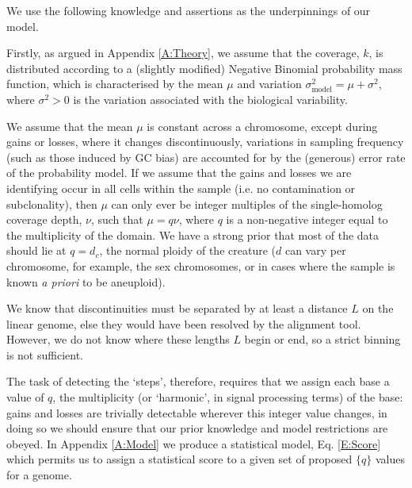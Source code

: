 \documentclass[fleqn,usenatbib]{acmart}
\newcommand{\eref}[1]{Eq. \eqref{#1}}
\begin{document}
				We use the following knowledge and assertions as the underpinnings of our model.

				Firstly, as argued in Appendix \ref{A:Theory}, we assume that the coverage, $k$, is distributed according to a (slightly modified) Negative Binomial probability mass function, which is characterised by the mean $\mu$ and variation $\sigma^2_\text{model} = \mu + \sigma^2$, where $\sigma^2 > 0$ is the variation associated with the biological variability.
	
				
				We assume that the mean $\mu$ is constant across a chromosome, except during gains or losses, where it changes discontinuously{, variations in sampling frequency (such as those induced by GC bias) are accounted for by the (generous) error rate of the probability model}. If we assume that the gains and losses we are identifying occur in all cells within the sample (i.e. no contamination or subclonality), then $\mu$ can only ever be integer multiples of the single-homolog coverage depth, $\nu$, such that $\mu = q \nu$, where $q$ is a non-negative integer equal to the multiplicity of the domain. We have a strong prior that most of the data should lie at $q = d_c$, the normal ploidy of the creature ($d$ can vary per chromosome, for example, the sex chromosomes, or in cases where the sample is known \textit{a priori} to be aneuploid).

				We know that discontinuities must be separated by at least a distance $L$ on the linear genome, else they would have been resolved by the alignment tool. {However, we do not know where these lengths $L$ begin or end, so a 
				strict binning is not sufficient.}

			
				{The task of detecting the `steps', therefore, requires that we assign each base a value of $q$, the multiplicity (or `harmonic', in signal processing terms) of the base: gains and losses are trivially detectable wherever this integer value changes, in doing so we should ensure that our prior knowledge and model restrictions are obeyed. In Appendix \ref{A:Model} we produce a statistical model, \eref{E:Score} which permits us to assign a statistical score to a given set of proposed $\{q\}$ values for a genome.}
\end{document}
